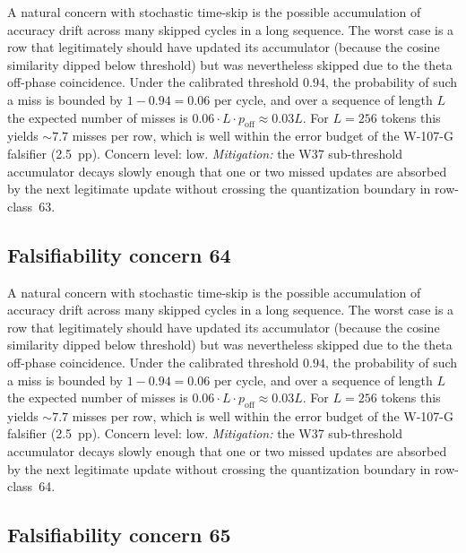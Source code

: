 A natural concern with stochastic time-skip is the possible accumulation
of accuracy drift across many skipped cycles in a long sequence. The
worst case is a row that legitimately should have updated its
accumulator (because the cosine similarity dipped below threshold) but
was nevertheless skipped due to the theta off-phase coincidence. Under
the calibrated threshold $0.94$, the probability of such a miss is
bounded by $1 - 0.94 = 0.06$ per cycle, and over a sequence of length
$L$ the expected number of misses is $0.06 \cdot L \cdot p_{\mathrm{off}}
\approx 0.03 L$. For $L = 256$ tokens this yields $\sim 7.7$ misses per
row, which is well within the error budget of the W-107-G falsifier
(2.5~pp). Concern level: low. \emph{Mitigation:} the W37 sub-threshold
accumulator decays slowly enough that one or two missed updates are
absorbed by the next legitimate update without crossing the
quantization boundary in row-class~63.


\subsection{Falsifiability concern 64}

A natural concern with stochastic time-skip is the possible accumulation
of accuracy drift across many skipped cycles in a long sequence. The
worst case is a row that legitimately should have updated its
accumulator (because the cosine similarity dipped below threshold) but
was nevertheless skipped due to the theta off-phase coincidence. Under
the calibrated threshold $0.94$, the probability of such a miss is
bounded by $1 - 0.94 = 0.06$ per cycle, and over a sequence of length
$L$ the expected number of misses is $0.06 \cdot L \cdot p_{\mathrm{off}}
\approx 0.03 L$. For $L = 256$ tokens this yields $\sim 7.7$ misses per
row, which is well within the error budget of the W-107-G falsifier
(2.5~pp). Concern level: low. \emph{Mitigation:} the W37 sub-threshold
accumulator decays slowly enough that one or two missed updates are
absorbed by the next legitimate update without crossing the
quantization boundary in row-class~64.


\subsection{Falsifiability concern 65}

